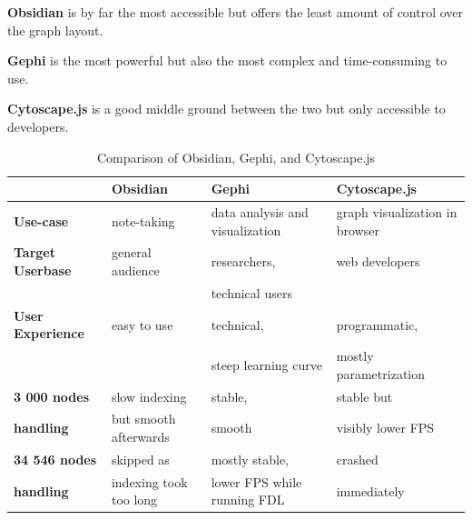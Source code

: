 \textbf{Obsidian} is by far the most accessible but offers the least amount of control over the graph layout.

\textbf{Gephi} is the most powerful but also the most complex and time-consuming to use.

\textbf{Cytoscape.js} is a good middle ground between the two but only accessible to developers.

\begin{table}[ht]
  \centering
  \caption{Comparison of Obsidian, Gephi, and Cytoscape.js}
  \label{tab:comparison}
  \begin{tabularx}{\textwidth}{|l|X|X|X|}
    \hline
    \textbf{}                     & \textbf{Obsidian}       & \textbf{Gephi}                      & \textbf{Cytoscape.js} \\ \hline
    \textbf{Use-case}             & note-taking             & data analysis and visualization     & graph visualization in browser \\ \hline
    \textbf{Target Userbase}      & general audience        & researchers,                        & web developers  \\ 
                                  &                         & technical users                     & \\ \hline
    \textbf{User Experience}      & easy to use             & technical,                          & programmatic, \\ 
                                  &                         & steep learning curve                & mostly parametrization\\ \hline
    \textbf{3 000 nodes}           & slow indexing           & stable,                             & stable but  \\ 
    \textbf{handling}             & but smooth afterwards   & smooth                              & visibly lower FPS\\ \hline
    \textbf{34 546 nodes}          & skipped as              & mostly stable,                      & crashed \\
    \textbf{handling}             & indexing took too long  & lower FPS while running FDL         & immediately\\ \hline
  \end{tabularx}
\end{table}